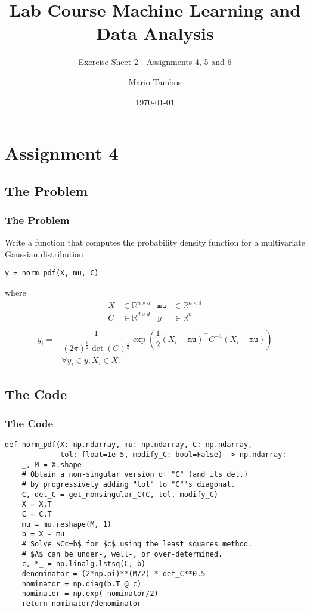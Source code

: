\documentclass[11pt]{beamer}
\author{Mario Tambos}
\title{Lab Course Machine Learning and Data Analysis}
\subtitle{Exercise Sheet 2 - Assignments 4, 5 and 6}
\institute{Machine Learning/Intelligent Data Analysis Group @ TU Berlin}
\date{\today}
\begin{document}
	\maketitle
	\section{Assignment 4}
	\subsection{The Problem}
	\begin{frame}[fragile=singleslide]
		\frametitle{The Problem}
        Write a function that computes the probability density function for a multivariate Gaussian distribution
        \begin{verbatim}
y = norm_pdf(X, mu, C)
        \end{verbatim}
        where
        \begin{align*}
            X &\in \mathbb{R}^{n \times d} &\texttt{mu} &\in \mathbb{R}^{n \times d} \\
            C &\in \mathbb{R}^{d \times d} &y 			&\in \mathbb{R}^{n} \\
            \end{align*}
            \begin{align*}
            y_i    		=& \dfrac{1}{(2\pi)^\frac{d}{2}\det(C)^\frac{1}{2}}
                            \exp\left(\dfrac{1}{2}(X_i-\texttt{mu})^\top C^{-1} (X_i - \texttt{mu}) \right)\\
            & \forall y_i \in y, X_i \in X
        \end{align*}
	\end{frame}
	\subsection{The Code}
	\begin{frame}[fragile=singleslide]
        \frametitle{The Code}
        \begin{verbatim}
def norm_pdf(X: np.ndarray, mu: np.ndarray, C: np.ndarray,
             tol: float=1e-5, modify_C: bool=False) -> np.ndarray:
    _, M = X.shape
    # Obtain a non-singular version of "C" (and its det.)
    # by progressively adding "tol" to "C"'s diagonal.
    C, det_C = get_nonsingular_C(C, tol, modify_C)
    X = X.T
    C = C.T
    mu = mu.reshape(M, 1)
    b = X - mu
    # Solve $Cc=b$ for $c$ using the least squares method.
    # $A$ can be under-, well-, or over-determined. 
    c, *_ = np.linalg.lstsq(C, b)
    denominator = (2*np.pi)**(M/2) * det_C**0.5
    nominator = np.diag(b.T @ c)
    nominator = np.exp(-nominator/2)
    return nominator/denominator
        \end{verbatim}
	\end{frame}
\end{document}
